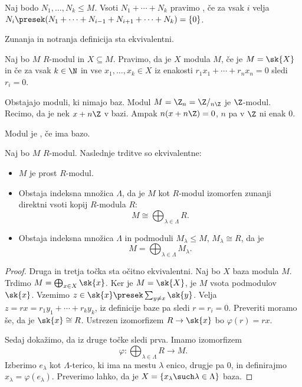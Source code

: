 \begin{definicija}
  Naj bodo $N_1, \ldots, N_k \le M$.
  Vsoti $N_1 + \cdots + N_k$ pravimo , če za vsak
  $i$ velja $N_i \presek (N_1 + \cdots + N_{i-1} + N_{i+1} + \cdots + N_k) =
  \{0\}$.
\end{definicija}

\begin{opomba}
  Zunanja in notranja definicija sta ekvivalentni.
\end{opomba}

\begin{definicija}
  Naj bo $M$ $R$-modul in $X \subseteq M$.
  Pravimo, da je $X$  modula $M$, če je $M = \sk{X}$ in če za vsak
  $k \in \N$ in vse $x_1, \ldots, x_k \in X$ iz enakosti $r_1 x_1 + \cdots + r_n
  x_n = 0$ sledi $r_i = 0$.
\end{definicija}

\begin{primer}
  Obstajajo moduli, ki nimajo baz.
  Modul $M = \Z_n = \Z/_{n \Z}$ je $\Z$-modul.
  Recimo, da je nek $x + n\Z$ v bazi.
  Ampak $n(x + n \Z) = 0$, $n$ pa v $\Z$ ni enak $0$.
\end{primer}

\begin{definicija}
  Modul je , če ima bazo.
\end{definicija}


\begin{izrek}
  Naj bo $M$ $R$-modul.
  Naslednje trditve so ekvivalentne:
  \begin{itemize}
  \item $M$ je prost $R$-modul.
  \item Obstaja indeksna množica $\Lambda$, da je $M$ kot $R$-modul izomorfen
	zunanji direktni vsoti kopij $R$-modula $R$:
	\[
	  M \cong \bigoplus_{\lambda \in \Lambda} R.
	\]
  \item Obstaja indeksna množica $\Lambda$ in podmoduli $M_\lambda \le M$,
	$M_\lambda \cong R$, da je
	\[
	  M = \bigoplus_{\lambda \in \Lambda} M_\lambda.
	\]
  \end{itemize}
\end{izrek}

\begin{proof}
  Druga in tretja točka sta očitno ekvivalentni.
  Naj bo $X$ baza modula $M$.
  Trdimo $M = \bigoplus_{x \in X} \sk{x}$.
  Ker je $M = \sk{X}$, je $M$ vsota podmodulov $\sk{x}$.
  Vzemimo $z \in \sk{x} \presek \sum_{y \ne x} \sk{y}$.
  Velja $z = rx = r_1 y_1 + \cdots + r_k y_k$, iz definicije baze pa sledi $r =
  r_i = 0$.
  Preveriti moramo še, da je $\sk{x} \cong R$.
  Ustrezen izomorfizem $R \to \sk{x}$ bo $\varphi(r) = rx$.

  Sedaj dokažimo, da iz druge točke sledi prva.
  Imamo izomorfizem
  \[
	\varphi : \bigoplus_{\lambda \in \Lambda} R \to M.
  \]
  Izberimo $e_\lambda$ kot $\Lambda$-terico, ki ima na mestu $\lambda$ enico,
  drugje pa $0$, in definirajmo $x_\lambda = \varphi(e_{\lambda})$.
  Preverimo lahko, da je $X = \{x_\lambda \such \lambda \in \Lambda\}$ baza.
\end{proof}

